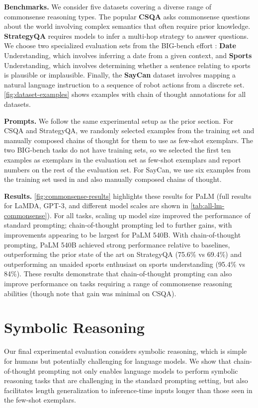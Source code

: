\documentclass[]{article}
\theoremstyle{plain}
\theoremstyle{definition}
\theoremstyle{remark}
\newcommand{\lamda}[0]{LaMDA}
\newcommand{\palm}[0]{PaLM}
\begin{document}
\textbf{Benchmarks.}
We consider five datasets covering a diverse range of commonsense reasoning types.
The popular \textbf{CSQA} \citep{talmor-etal-2019-commonsenseqa} asks commonsense questions about the world involving complex semantics that often require prior knowledge.
\textbf{StrategyQA} \citep{geva-etal-2021-aristotle} requires models to infer a multi-hop strategy to answer questions.
We choose two specialized evaluation sets from the BIG-bench effort \citep{bigbench}: \textbf{Date} Understanding, which involves inferring a date from a given context, and \textbf{Sports} Understanding, which involves determining whether a sentence relating to sports is plausible or implausible.
Finally, the \textbf{SayCan} dataset \citep{ahn2022can} involves mapping a natural language instruction to a sequence of robot actions from a discrete set.
\cref{fig:dataset-examples} shows examples with chain of thought annotations for all datasets.

\textbf{Prompts.}
We follow the same experimental setup as the prior section. 
For CSQA and StrategyQA, we randomly selected examples from the training set and manually composed chains of thought for them to use as few-shot exemplars.
The two BIG-bench tasks do not have training sets, so we selected the first ten examples as exemplars in the evaluation set as few-shot exemplars and report numbers on the rest of the evaluation set.
For SayCan, we use six examples from the training set used in \citet{ahn2022can} and also manually composed chains of thought.

\textbf{Results.}
\cref{fig:commonsense-results} highlights these results for \palm{} (full results for \lamda{}, GPT-3, and different model scales are shown in \cref{tab:all-lm-commonsense}).
For all tasks, scaling up model size improved the performance of standard prompting; chain-of-thought prompting led to further gains, with improvements appearing to be largest for \palm{} 540B.
With chain-of-thought prompting, \palm{} 540B achieved strong performance relative to baselines, outperforming the prior state of the art on StrategyQA (75.6\% vs 69.4\%) and outperforming an unaided sports enthusiast on sports understanding (95.4\% vs 84\%).
These results demonstrate that chain-of-thought prompting can also improve performance on tasks requiring a range of commonsense reasoning abilities (though note that gain was minimal on CSQA).





\section{Symbolic Reasoning}\label{sec:symbolic-reasoning}
Our final experimental evaluation considers symbolic reasoning, which is simple for humans but potentially challenging for language models.
We show that chain-of-thought prompting not only enables language models to perform symbolic reasoning tasks that are challenging in the standard prompting setting, but also facilitates length generalization to inference-time inputs longer than those seen in the few-shot exemplars.
\end{document}
